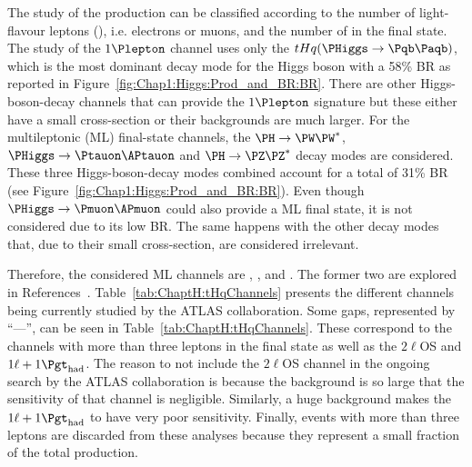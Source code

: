 The study of the \tHq production can be classified according to the number of light-flavour leptons (\Plepton),
i.e. electrons or muons, and the number of \tauhad in the final state.  %
The study of the $1\Plepton$ channel uses only the $\tHq(\PHiggs \rightarrow \bbbar)$, which is the most dominant
decay mode for the Higgs boson with a 58\% BR as reported in Figure~\ref{fig:Chap1:Higgs:Prod_and_BR:BR}.
There are other Higgs-boson-decay channels that can provide the $1\Plepton$ signature but these either have a small cross-section or their backgrounds are much larger.
For the multileptonic (ML) final-state channels, the $\HWW$, %
$\PHiggs \rightarrow  \Ptauon \APtauon$ and $\HZZ$ decay modes are considered. 
These three Higgs-boson-decay  
modes combined account for a total of 31\% BR (see Figure~\ref{fig:Chap1:Higgs:Prod_and_BR:BR}).
Even though $\PHiggs \rightarrow \Pmuon\APmuon$ could also provide a ML final state, it is not considered due to its low BR. 
 The same happens with the other decay modes that, due to their small cross-section, are considered irrelevant.
 
Therefore, the considered ML channels are \dilepSS, \trilep, \dileptau and \lepditau. 
The former two are explored in References~\cite{Tariq:2883582, GuerreroRojas:2875564}.
Table~\ref{tab:ChaptH:tHqChannels} presents the different channels being currently studied by the ATLAS collaboration.
Some gaps, represented by ``---'', can be seen in Table~\ref{tab:ChaptH:tHqChannels}. These correspond
to the channels with more than three leptons in the final state as well as the $2\ell$OS and $1\ell + 1\tauhad$. 
The reason to not include the $2\ell$OS channel in the ongoing search by the ATLAS collaboration is because the \ttbar
background is so large that the sensitivity of that channel is negligible.  
Similarly, a huge background makes the $1\ell + 1\tauhad$ to have very poor sensitivity.
Finally, events with more than three leptons are discarded from these analyses because 
they represent a small fraction of the total \tHq production.


